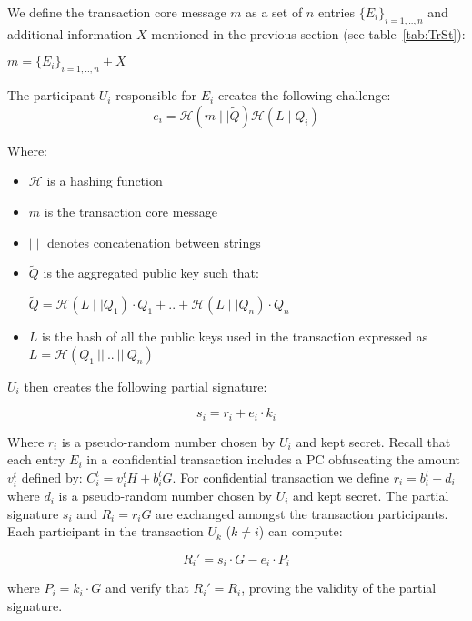 We define the transaction core message $m$ as a set of $n$ entries $\{E_i\}_{i=1,..,n}$  and additional information $X$ mentioned in the previous section (see table~\ref{tab:TrSt}):
\begin{center}
$m = \{E_i\}_{i=1,..,n} + X$ 
\end{center}

The participant $U_i$ responsible for $E_i$ creates the following challenge:
\begin{equation} 
e_i = \mathcal{H}(m \mid\mid \tilde{Q})\mathcal{H}(L \mid Q_i)
\end{equation} 

Where:

\begin{itemize}
	\item$\mathcal{H}$ is a hashing function
	\item$m$ is the transaction core message 
	\item$\mid\mid$ denotes concatenation between strings
	\item$\tilde{Q}$ is the aggregated public key such that:
\begin{center}
$\tilde{Q}=\mathcal{H}(L \mid\mid Q_1)\cdot Q_1 + .. + \mathcal{H}(L \mid\mid Q_n)\cdot Q_n$
\end{center}
	\item$L$ is the hash of all the public keys used in the transaction expressed as $L=\mathcal{H}(Q_1~||~..~||~Q_n)$
\end{itemize}

$U_i$ then creates the following partial signature:  

\begin{equation} 
s_{i} = r_i + e_i\cdot k_i
\end{equation}

Where $r_i$ is a pseudo-random number chosen by $U_i$ and kept secret. Recall that each entry $E_i$ in a confidential transaction includes a PC obfuscating the amount $v_i^{t}$ defined by: $C_i^{t} = v_i ^{t} H + b_i^{t} G$. For confidential transaction we define $r_i = b_i^t + d_i$ where $d_i$ is a pseudo-random number chosen by $U_i$ and kept secret.
The partial signature $s_i$ and $R_i = r_iG$ are exchanged amongst the transaction participants. Each participant in the transaction $U_k$ ($k\neq i$) can compute:

\begin{equation} 
R_i' = s_{i}\cdot G - e_i\cdot P_i
\end{equation}

where $P_i = k_i\cdot G$ and verify that $R_i' = R_i$, proving the validity of the partial signature. \\

